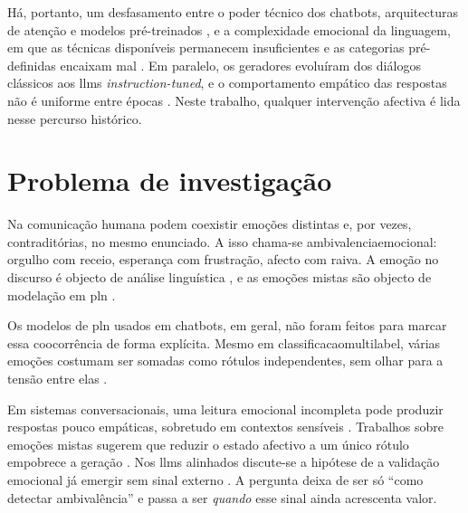 Há, portanto, um desfasamento entre o poder técnico dos chatbots, arquitecturas de atenção e modelos pré-treinados \parencite{Vaswani2017Attention, Devlin2019BERT}, e a complexidade emocional da linguagem, em que as técnicas disponíveis permanecem insuficientes e as categorias pré-definidas encaixam mal \parencite{PlazaDelArco2024Trends, Seyeditabari2018Review}. Em paralelo, os geradores evoluíram dos diálogos clássicos aos \glspl{llm} \textit{instruction-tuned}, e o comportamento empático das respostas não é uniforme entre épocas \parencite{Rashkin2019Empathy, Ou2024DialogBench, Welivita2026HumansOrLLMs}. Neste trabalho, qualquer intervenção afectiva é lida nesse percurso histórico.


\section{Problema de investigação}
\label{sec:problema}

Na comunicação humana podem coexistir emoções distintas e, por vezes, contraditórias, no mesmo \gls{enunciado}. A isso chama-se \gls{ambivalenciaemocional}: orgulho com receio, esperança com frustração, afecto com raiva. A emoção no discurso é objecto de análise linguística \parencite{Wiebe2005Opinions}, e as emoções mistas são objecto de modelação em \gls{pln} \parencite{Zhao2026MEGE, Singh2026MultiEmotionIntensity}.

Os modelos de \gls{pln} usados em chatbots, em geral, não foram feitos para marcar essa coocorrência de forma explícita. Mesmo em \gls{classificacaomultilabel}, várias emoções costumam ser somadas como rótulos independentes, sem olhar para a tensão entre elas \parencite{Singh2026MultiEmotionIntensity, Zhao2026MEGE}.

Em sistemas conversacionais, uma leitura emocional incompleta pode produzir respostas pouco empáticas, sobretudo em contextos sensíveis \parencite{Sharma2020Empathy, Rashkin2019Empathy}. Trabalhos sobre emoções mistas sugerem que reduzir o estado afectivo a um único rótulo empobrece a geração \parencite{Zhao2026MEGE, Wan2025EmoDynamiX, Singh2026MultiEmotionIntensity}. Nos \glspl{llm} alinhados discute-se a hipótese de a validação emocional já emergir sem sinal externo \parencite{Bieberstein2026PromptEmpathy, Welivita2026HumansOrLLMs}. A pergunta deixa de ser só ``como detectar ambivalência'' e passa a ser \textit{quando} esse sinal ainda acrescenta valor.

